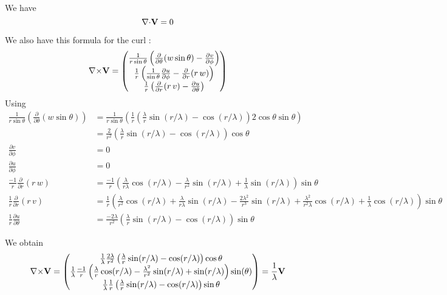 We have \begin{equation} {\nabla\cdot}{\mathbf{V}} = 0 \end{equation}

We also have this formula for the curl :
\[{\nabla\times}{\mathbf{V}} = \begin{pmatrix}
\frac{1}{r\sin\theta}\left(\frac{\partial}{\partial\theta}(w\sin\theta) -
  \frac{\partial v}{\partial\phi}\right)\\
\frac{1}{r}\left(\frac{1}{\sin\theta}\frac{\partial u}{\partial\phi} -
  \frac{\partial}{\partial r}(r\,w)\right)\\
\frac{1}{r}\left(\frac{\partial}{\partial r}(r\,v) - \frac{\partial u}{\partial\theta}\right)
\end{pmatrix}\]
Using
\begin{align*}
\frac{1}{r\sin\theta}\left(\frac{\partial}{\partial\theta}(w\sin\theta)\right)
&= \frac{1}{r\sin\theta}\left(\frac{1}{r}\left(\frac{\lambda}{r}\sin(r/\lambda)
    - \cos(r/\lambda)\right)2\cos\theta\sin\theta\right)\\
&= \frac{2}{r^2}\left(\frac{\lambda}{r}\sin(r/\lambda)
    - \cos(r/\lambda)\right)\cos\theta\\
\frac{\partial v}{\partial\phi} &= 0\\
\frac{\partial u}{\partial\phi} &= 0\\
\frac{-1}{r}\frac{\partial}{\partial r}(r\,w) &=
\frac{-1}{r}\left(\frac{\lambda}{r\lambda}\cos(r/\lambda)-\frac{\lambda}{r^2}\sin(r/\lambda)+\frac{1}{\lambda}\sin(r/\lambda)\right)\sin\theta\\
\frac{1}{r}\frac{\partial}{\partial r}(r\,v) &= \frac{1}{r}\left(
  \frac{\lambda}{r^2}\cos(r/\lambda) + \frac{\lambda}{r\lambda}\sin(r/\lambda) -
  \frac{2\lambda^2}{r^3}\sin(r/\lambda)
  +\frac{\lambda^2}{r^2\lambda}\cos(r/\lambda) +
  \frac{1}{\lambda}\cos(r/\lambda) \right) \sin\theta\\
\frac{1}{r}\frac{\partial u}{\partial \theta} &= \frac{-2\lambda}{r^2}\left(
  \frac{\lambda}{r}\sin(r/\lambda) - \cos(r/\lambda)\right)\sin\theta
\end{align*}

We obtain 
\begin{equation} {\nabla\times}{\mathbf{V}} = \begin{pmatrix}
\frac{1}{\lambda}\frac{2\lambda}{r^2}\left(\frac{\lambda}{r}\sin(r/\lambda)-\cos(r/\lambda)\right)\cos\theta\\
\frac{1}{\lambda}\frac{-1}{r}\left(\frac{\lambda}{r}\cos(r/\lambda) -
  \frac{\lambda^2}{r^2}\sin(r/\lambda) + \sin(r/\lambda)\right)\sin(\theta)\\
\frac{1}{\lambda}\frac{1}{r}\left(\frac{\lambda}{r}\sin(r/\lambda) -
  \cos(r/\lambda)\right)\sin\theta
\end{pmatrix} = \frac{1}{\lambda}{\mathbf{V}} \end{equation}

